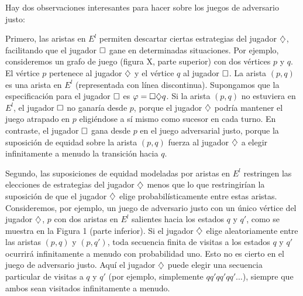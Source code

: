 Hay dos observaciones interesantes para hacer sobre los juegos de adversario
justo:

Primero, las aristas en $E^l$ permiten descartar ciertas estrategias del
jugador $\diamondsuit$, facilitando que el jugador $\square$ gane en determinadas
situaciones. Por ejemplo, consideremos un grafo de juego (figura X, parte
superior) con dos vértices $p$ y $q$. El vértice $p$ pertenece al jugador
$\diamondsuit$ y el vértice $q$ al jugador $\square$. La arista $(p, q)$ es una arista
en $E^l$ (representada con línea discontinua). Supongamos que la especificación
para el jugador $\square$ es $\varphi = \square \diamondsuit q$. Si la arista $(p, q)$ no
estuviera en $E^l$, el jugador $\square$ no ganaría desde $p$, porque el jugador
$\diamondsuit$ podría mantener el juego atrapado en $p$ eligiéndose a sí mismo como
sucesor en cada turno. En contraste, el jugador $\square$ gana desde $p$ en el
juego adversarial justo, porque la suposición de equidad sobre la arista $(p,
	q)$ fuerza al jugador $\diamondsuit$ a elegir infinitamente a menudo la transición
hacia $q$.

Segundo, las suposiciones de equidad modeladas por aristas en $E^l$ restringen
las elecciones de estrategias del jugador $\diamondsuit$ menos que lo que
restringirían la suposición de que el jugador $\diamondsuit$ elige probabilísticamente
entre estas aristas. Consideremos, por ejemplo, un juego de adversario justo
con un único vértice del jugador $\diamondsuit$, $p$ con dos aristas en $E^l$
salientes hacia los estados $q$ y $q'$, como se muestra en la Figura 1 (parte
inferior). Si el jugador $\diamondsuit$ elige aleatoriamente entre las aristas $(p,
	q)$ y $(p, q')$, toda secuencia finita de visitas a los estados $q$ y $q'$
ocurrirá infinitamente a menudo con probabilidad uno. Esto no es cierto en el
juego de adversario justo. Aquí el jugador $\diamondsuit$ puede elegir una secuencia
particular de visitas a $q$ y $q'$ (por ejemplo, simplemente $qq'qq'qq'\dots$),
siempre que ambos sean visitados infinitamente a menudo.

